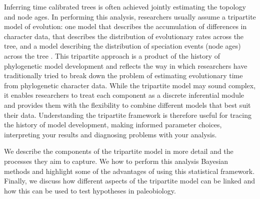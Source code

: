 Inferring time calibrated trees is often achieved  jointly estimating the topology and node ages.
In performing this analysis, researchers usually assume a tripartite model of evolution: one model that describes the accumulation of differences in character data,  that describes the distribution of evolutionary rates across the tree, and a  model describing the distribution of speciation events (node ages) across the tree \citep{Thorne1998,Kishino2001,Yang2006,Drummond2006}.
This tripartite approach is a product of the history of phylogenetic model development and reflects the way in which researchers have traditionally tried to break down the problem of estimating evolutionary time from phylogenetic character data.
While the tripartite model may sound complex, it enables researchers to treat each component as a discrete inferential module and provides them with the flexibility to combine different models that best suit their data.
Understanding the tripartite framework is therefore useful for tracing the history of model development, making informed parameter choices, interpreting your results and diagnosing problems with your analysis.


We describe the components of the tripartite model in more detail and the processes they aim to capture.
We  how to perform this analysis  Bayesian methods and highlight some of the advantages of using this statistical framework.
Finally, we discuss how different aspects of the tripartite model can be linked and how this can be used to test hypotheses in paleobiology.


